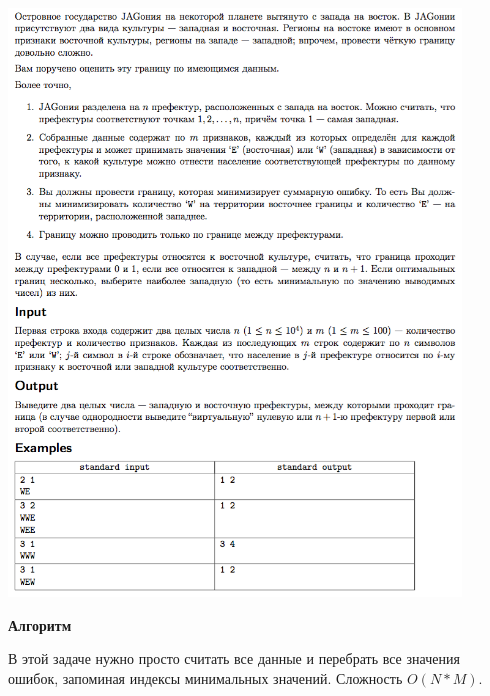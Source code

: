 \documentclass[a4paper,12pt]{article}
\begin{document}
\begin{center}
\includegraphics[width=0.9\textwidth]{OC_Japan/A.png}\\ [1cm]
\end{center}

\textbf{{\large Алгоритм}}

В этой задаче нужно просто считать все данные и перебрать все значения ошибок, запоминая индексы минимальных значений. Сложность $O(N * M)$.
\end{document}
